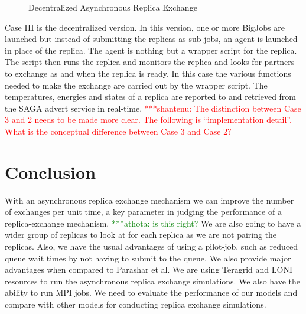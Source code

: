 \documentclass[a4paper,10pt]{article}
\newcommand{\jhanote}[1]{ {\textcolor{red} { ***shantenu: #1 }}}
\newcommand{\athotanote}[1]{ {\textcolor{green} { ***athota: #1 }}}
\newcommand{\jhanote}[1]{}
\newcommand{\athotanote}[1]{}
\begin{document}
\begin{figure}
\centering


\caption{\small Decentralized Asynchronous Replica Exchange}
\label{fig:decentralized}
\end{figure}

Case III is the decentralized version. In this version, one or more BigJobs are launched but instead of submitting the replicas as sub-jobs, an agent is launched in place of the replica. The agent is nothing but a wrapper script for the replica. The script then runs the replica and monitors the replica and looks for partners to exchange as and when the replica is ready. In this case the various functions needed to make the exchange are carried out by the wrapper script. The temperatures, energies and states of a replica are reported to and retrieved from the SAGA advert service in real-time.
\jhanote{The distinction between
  Case 3 and 2 needs to be made more clear. The following is
  ``implementation detail''. What is the conceptual difference between
  Case 3 and Case 2?} 

\section{Conclusion}
With an asynchronous replica exchange mechanism we can improve the number of exchanges per unit time, 
a key parameter in judging the performance of a replica-exchange mechanism. \athotanote{is this right? } 
We are also going to have a wider group of replicas to look at for each replica as we are not pairing 
the replicas. Also, we have the usual advantages of using a pilot-job, such as reduced queue wait 
times by not having to submit to the queue. 
We also provide major advantages when compared to Parashar et al. We are using Teragrid and LONI resources to run the asynchronous replica exchange simulations. We also have the ability to run MPI jobs. We need to evaluate the performance of our models and compare with other models for conducting replica exchange simulations. 
\end{document}
